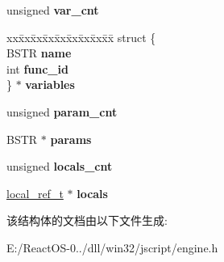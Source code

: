\begin{DoxyCompactItemize}
\mbox{\label{struct__function__code__t_a104af1e0293baff4a005877f91a6c15a}} 
unsigned {\bfseries var\+\_\+cnt}
\item 
\mbox{\label{struct__function__code__t_a803758d9f2cba00c5ac7404af3a1250c}} 
\begin{tabbing}
xx\=xx\=xx\=xx\=xx\=xx\=xx\=xx\=xx\=\kill
struct \{\\
\>BSTR {\bfseries name}\\
\>int {\bfseries func\_id}\\
\} $\ast$ {\bfseries variables}\\

\end{tabbing}\item 
\mbox{\label{struct__function__code__t_aaba6918079c28af3b979d9081a60957d}} 
unsigned {\bfseries param\+\_\+cnt}
\item 
\mbox{\label{struct__function__code__t_a68f92fbe84b6ccc5287577e133f5078d}} 
B\+S\+TR $\ast$ {\bfseries params}
\item 
\mbox{\label{struct__function__code__t_a68fceb6c29e386fbbcc152e3cbdaada5}} 
unsigned {\bfseries locals\+\_\+cnt}
\item 
\mbox{\label{struct__function__code__t_a60852c61100b0c89f50f6a092f450c00}} 
\hyperlink{structlocal__ref__t}{local\+\_\+ref\+\_\+t} $\ast$ {\bfseries locals}
\end{DoxyCompactItemize}


该结构体的文档由以下文件生成\+:\begin{DoxyCompactItemize}
\item 
E\+:/\+React\+O\+S-\/0../dll/win32/jscript/engine.\+h\end{DoxyCompactItemize}
